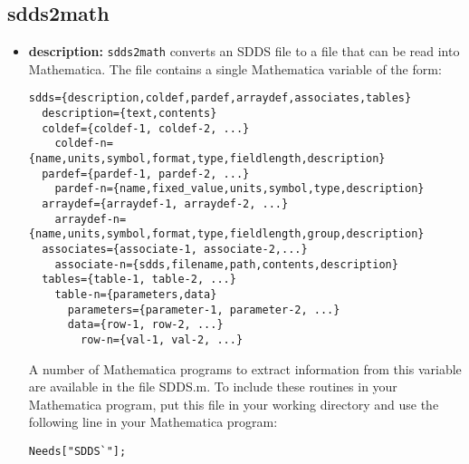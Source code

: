 \begin{latexonly} 
\newpage 
\end{latexonly} 
\subsection{sdds2math} 
\label{sdds2math} 
 
\begin{itemize} 
\item {\bf description:} 
\verb|sdds2math| converts an SDDS file to a file that can be read into Mathematica. 
The file contains a single Mathematica variable of the form: 
 
\begin{verbatim} 
sdds={description,coldef,pardef,arraydef,associates,tables} 
  description={text,contents} 
  coldef={coldef-1, coldef-2, ...} 
    coldef-n={name,units,symbol,format,type,fieldlength,description} 
  pardef={pardef-1, pardef-2, ...} 
    pardef-n={name,fixed_value,units,symbol,type,description} 
  arraydef={arraydef-1, arraydef-2, ...} 
    arraydef-n={name,units,symbol,format,type,fieldlength,group,description} 
  associates={associate-1, associate-2,...} 
    associate-n={sdds,filename,path,contents,description} 
  tables={table-1, table-2, ...} 
    table-n={parameters,data} 
      parameters={parameter-1, parameter-2, ...} 
      data={row-1, row-2, ...} 
        row-n={val-1, val-2, ...} 
\end{verbatim} 
 
A number of Mathematica programs to extract information from this 
variable are available in the file SDDS.m.  To include these routines 
in your Mathematica program, put this file in your working directory 
and use the following line in your Mathematica program: 
\begin{verbatim} 
Needs["SDDS`"]; 
\end{verbatim} 
 

\end{itemize}
